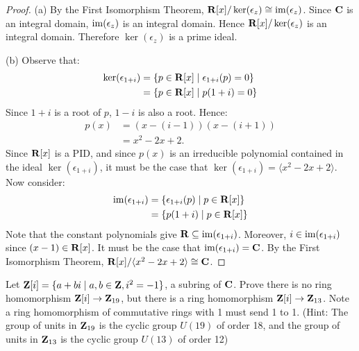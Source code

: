 \documentclass[10pt,twoside,openany]{memoir}
\begin{document}
    {\color{blue} \begin{proof}
        (a) By the First Isomorphism Theorem, $\mathbf{R}[x]/\ker(\epsilon_z) \cong \operatorname{im}(\epsilon_z)$. Since $\mathbf{C}$ is an integral domain, $\operatorname{im}(\epsilon_z)$ is an integral domain. Hence $\mathbf{R}[x]/\ker(\epsilon_z)$ is an integral domain. Therefore $\ker(\epsilon_z)$ is a prime ideal.

        (b) Observe that:
            \begin{equation*}
            \begin{split}
                \ker(\epsilon_{1+i})
                & = \{p \in \mathbf{R}[x] \mid \epsilon_{1+i}(p) = 0\} \\
                & = \{p \in \mathbf{R}[x] \mid p(1+i) = 0\} \\
            \end{split}
            \end{equation*}
        Since $1+i$ is a root of $p$, $1-i$ is also a root. Hence:
            \begin{equation*}
            \begin{split}
                p(x) 
                & = (x-(i-1))(x-(i+1)) \\
                & = x^2 - 2x + 2.
            \end{split}
            \end{equation*}
        Since $\mathbf{R}[x]$ is a PID, and since $p(x)$ is an irreducible polynomial contained in the ideal $\ker(\epsilon_{1+i})$, it must be the case that $\ker(\epsilon_{1+i}) = \langle x^2-2x+2 \rangle$. Now consider:
            \begin{equation*}
            \begin{split}
                \operatorname{im}(\epsilon_{1+i})
                & = \{\epsilon_{1+i}(p) \mid p \in \mathbf{R}[x]\} \\
                & = \{p(1+i) \mid p \in \mathbf{R}[x]\} \\
            \end{split}
            \end{equation*}
        Note that the constant polynomials give $\mathbf{R} \subseteq \operatorname{im}(\epsilon_{1+i})$. Moreover, $i \in \operatorname{im}(\epsilon_{1+i})$ since $(x-1) \in \mathbf{R}[x]$. It must be the case that $\operatorname{im}(\epsilon_{1+i}) = \mathbf{C}$. By the First Isomorphism Theorem, $\mathbf{R}[x]/\langle x^2-2x+2 \rangle \cong \mathbf{C}$.
    \end{proof}}
\begin{problem}[S24, P4]
    Let $\mathbf{Z}[i] = \{a+bi \mid a,b \in \mathbf{Z}, i^2 = -1\}$, a subring of $\mathbf{C}$. Prove there is no ring homomorphism $\mathbf{Z}[i] \rightarrow \mathbf{Z}_{19}$, but there is a ring homomorphism $\mathbf{Z}[i] \rightarrow \mathbf{Z}_{13}$. Note a ring homomorphism of commutative rings with 1 must send 1 to 1. (Hint: The group of units in $\mathbf{Z}_{19}$ is the cyclic group $U(19)$ of order 18, and the group of units in $\mathbf{Z}_{13}$ is the cyclic group $U(13)$ of order 12)
\end{problem}
\end{document}
